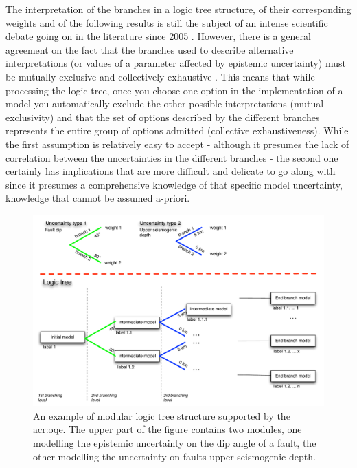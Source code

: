 The interpretation of the branches in a logic tree structure, of their 
corresponding weights and of the following results is still the subject 
of an intense scientific debate going on in the literature since 2005 
\parencite{abrahamson2005,mcguire2005,scherbaum2011,musson2012}.
%
However, there is a general agreement on the fact that the branches used to 
describe alternative interpretations (or values of a parameter affected by
epistemic uncertainty) must be mutually exclusive and collectively exhaustive
\parencite{bommer2008}. 
%
This means that  while processing the logic tree, once you choose one option 
in the implementation of a model you automatically exclude the other possible 
interpretations (mutual exclusivity) and that the set of options described 
by the different branches represents the entire group of options admitted 
(collective exhaustiveness). 
%
While the first assumption is relatively easy to accept - although it presumes 
the lack of correlation between the uncertainties in the different branches - 
the second one certainly has implications that are more difficult and delicate 
to go along with since it presumes a comprehensive knowledge of that specific 
model uncertainty, knowledge that cannot be assumed a-priori. 
%
\begin{figure}[!ht]
\includegraphics[width=\textwidth]{./Pictures/lts/logic_tree.pdf}
\caption{An example of modular logic tree structure supported by the
    \gls{acr:oqe}. The upper part of the figure contains two modules, one
    modelling the epistemic uncertainty on the dip angle of a fault, the 
    other modelling the uncertainty on faults upper seismogenic depth.}
\label{fig:logic_tree}
\end{figure}
%
